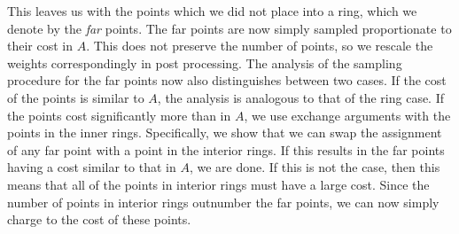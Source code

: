 This leaves us with the points which we did not place into a ring, which we denote by the \emph{far} points. The far points are now simply sampled proportionate to their cost in $A$. This does not preserve the number of points, so we rescale the weights correspondingly in post processing.
The analysis of the sampling procedure for the far points now also distinguishes between two cases. If the cost of the points is similar to $A$, the analysis is analogous to that of the ring case. If the points cost significantly more than in $A$, we use exchange arguments with the points in the inner rings. Specifically, we show that we can swap the assignment of any far point with a point in the interior rings. If this results in the far points having a cost similar to that in $A$, we are done. If this is not the case, then this means that all of the points in interior rings must have a large cost. Since the number of points in interior rings outnumber the far points, we can now simply charge to the cost of these points.







